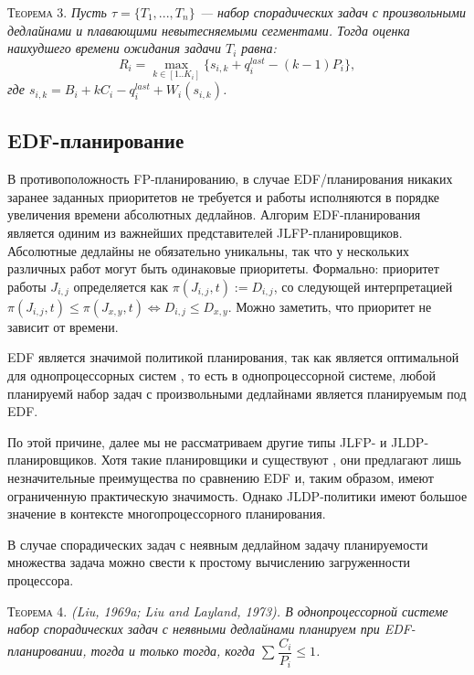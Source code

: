 \textsc{Теорема 3.}
\textit{Пусть $\tau = \{T_1, ... , T_n\}$ --- набор спорадических задач с
  произвольными дедлайнами и плавающими невытесняемыми сегментами. Тогда оценка
  наихудшего времени ожидания задачи $T_i$ равна: $$R_i = \max_{k \in [1..K_i]} \{ s_{i,k} + q^{last}_i - (k - 1) P_i\},$$
  где $s_{i,k} = B_i + kC_i - q^{last}_i + W_i(s_{i,k})$.
}

\subsection{EDF-планирование}

В противоположность FP-планированию, в случае EDF\-/планирования никаких заранее заданных приоритетов не требуется и работы исполняются в порядке увеличения времени абсолютных дедлайнов. Алгорим EDF-планирования является одиним из важнейших представителей JLFP-планировщиков. Абсолютные дедлайны не обязательно уникальны, так что у нескольких различных работ могут быть одинаковые приоритеты. Формально: приоритет работы $J_{i,j}$ определяется как $\pi (J_{i, j}, t) := D_{i, j}$, со следующей интерпретацией $\pi (J_{i, j}, t) \leq \pi (J_{x, y}, t) \Leftrightarrow D_{i , j} \leq D_{x, y}$. Можно заметить, что приоритет не зависит от времени.

EDF является значимой политикой планирования, так как является оптимальной для однопроцессорных систем \cite{Dhall, Liu1973SchedulingAF}, то есть в однопроцессорной системе, любой планируемй набор задач с произвольными дедлайнами является планируемым под EDF.

По этой причине, далее мы не рассматриваем другие типы JLFP- и JLDP- планировщиков. Хотя такие планировщики и существуют \cite{Davis1993SchedulingST}, они предлагают лишь незначительные преимущества по сравнению EDF и, таким образом, имеют ограниченную практическую значимость. Однако JLDP-политики имеют большое значение в контексте многопроцессорного планирования.

В случае спорадических задач с неявным дедлайном задачу планируемости множества задача можно свести к простому вычислению загруженности процессора.


\textsc{Теорема 4. }
\textit{(Liu, 1969a; Liu and Layland, 1973). В однопроцессорной системе набор спорадических задач с неявными дедлайнами планируем при EDF-планировании, тогда и только тогда, когда $\sum_{} \dfrac{C_i}{P_i} \leq 1$.
}


